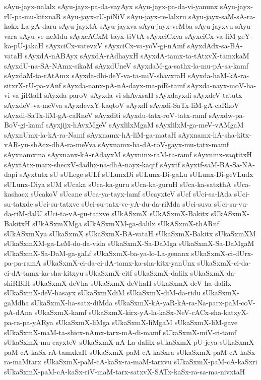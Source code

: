 {sAyu-jayx-nalalx
sAyu-jayx-pa-da-vayAyx
sAyu-jayx-pa-da-vi-yanunx
sAyu-jayx-rU-pa-mu-kitxnaR
sAyu-jayx-rU-piNiV
sAyu-jayx-re-lalxru
sAyu-jayx-saM-sA-ra-kokx-La-gA-daru
sAyu-jayxtA
sAyu-jayxva
sAyu-jayx-veMba
sAyu-jayxvu
sAyu-vara
sAyu-ve-neMdu
sAyxcACxM-tayx-tiVtA
sAyxciCxva
sAyxciCx-va-liM-geY-ka-pU-jakaH
sAyxciCx-vatevxV
sAyxciCx-va-yoV-gi-nAmf
sAyxdAdx-sa-BA-vataH
sAyxdA-nABAyx
sAyxdA-rAdhayxH
sAyxdA-tamx-ta-tAtxvX-tamxkaM
sAyxdU-na-SA-NAmx-sikaM
sAyxdUneV
sAyxdaM-ga-sathx-la-mu-pA-sa-kamf
sAyxdaM-ta-rAtAmx
sAyxda-dhi-deY-va-ta-miV-shavxraH
sAyxda-haM-kA-ra-sitxrX-rU-pa-vAnf
sAyxda-nanx-pA-nA-dayx-ma-piR-tamf
sAyxda-nayx-moV-ha-vi-va-jiRtaH
sAyxda-paroV
sAyxda-vi-shAvxsaH
sAyxdayxdi
sAyxdeV-tatutx
sAyxdeV-va-meVva
sAyxdevxY-kaqtoV
sAyxdf
sAyxdi-SaTx-liM-gA-caRkoV
sAyxdi-SaTx-liM-gA-caRneV
sAyxditi
sAyxdu-tatx-roV-tatx-ramf
sAyxdw-pa-BoV-gi-kamf
sAyxjijx-hAvxMgeV
sAyxlilxMgaM
sAyxlilxM-ga-meV-vAMgaM
sAyxnUmx-la-kA-ra-Namf
sAyxnamx-hA-liM-ga-mataH
sAyxnamx-hA-sha-kitx-vAR-yu-shAcx-dhA-ra-meVva
sAyxnamx-ha-dA-roV-gayx-mu-tatx-mamf
sAyxnamxma
sAyxnanx-kA-rAdayxM
sAyxninx-raM-ta-ramf
sAyxninx-vaqtitxH
sAyxtAtx-marx-shecxV-dadhx-na-dhA-nayx-kaqtf
sAyxtf
sAyxtf-saM-BA-Sa-NA-dapi
sAyxtutx
sU
sULege
sULf
sULunxDi
sULunx-Di-gaLu
sULunx-Di-geVLudx
sULunx-Diya
sUM
sUcaka
sUca-ka-guru
sUca-ka-guruH
sUca-ka-satxthA
sUca-kashacx
sUcakoV
sUcane
sUca-ya-tayx-lamf
sUcayxteV
sUcf
sUci-sa-lAda
sUci-su-tatxde
sUci-su-tatxve
sUci-su-tatx-ve-yA-du-da-riMda
sUci-suva
sUci-su-vu-da-riM-dalU
sUci-ta-vA-gu-tatxve
sUkASxmX
sUkASxmX-Bakitx
sUkASxmX-BakitxH
sUkASxmXMga
sUkASxmXM-ga-dalilx
sUkASxmX-thARnf
sUkASxmXya
sUkaSxmX
sUkaSxmX-BA-vataH
sUkaSxmX-Bakitx
sUkaSxmXM
sUkaSxmXM-ga-LeM-do-da-vida
sUkaSxmX-Sa-DaMga
sUkaSxmX-Sa-DaMgaM
sUkaSxmX-Sa-DaM-ga-gaLf
sUkaSxmX-ba-ya-lo-La-genanx
sUkaSxmX-ci-dUrx-pa-pa-ramA
sUkaSxmX-ci-da-ci-dA-tamx-ka-sha-kitx-yanUnx
sUkaSxmX-ci-da-ci-dA-tamx-ka-sha-kitxyu
sUkaSxmX-citf
sUkaSxmX-dalilx
sUkaSxmX-da-shiRBiH
sUkaSxmX-deVha
sUkaSxmX-deVhaH
sUkaSxmX-deV-ha-dalilx
sUkaSxmX-deV-hasayx
sUkaSxmXdiM
sUkaSxmX-diM-da-ridu
sUkaSxmX-gaMdha
sUkaSxmX-ha-satx-diMda
sUkaSxmX-kA-yaR-kA-ra-Na-parx-paM-coV-pA-dAna
sUkaSxmX-kamf
sUkaSxmX-kirx-yA-la-kaSx-NeV-cACx-sha-katxyX-pa-ra-pa-yARya
sUkaSxmX-liMga
sUkaSxmX-liMgaM
sUkaSxmX-liM-gave
sUkaSxmX-maM-ta-shicx-nAmx-tarx-mA-di-mamf
sUkaSxmX-miV-ri-tamf
sUkaSxmX-mu-cayxteV
sUkaSxmX-nA-La-dalilx
sUkaSxmX-pU-jeya
sUkaSxmX-paM-cA-kaSx-rA-tamxkaH
sUkaSxmX-paM-cA-kaSxra
sUkaSxmX-paM-cA-kaSx-ra-maMtarx
sUkaSxmX-paM-cA-kaSx-ra-maM-tarxvu
sUkaSxmX-paM-cA-kaSxri
sUkaSxmX-paM-cA-kaSx-riV-maM-tarx-satxvX-SATx-kaSx-ra-sa-ma-nivxtaH
}
